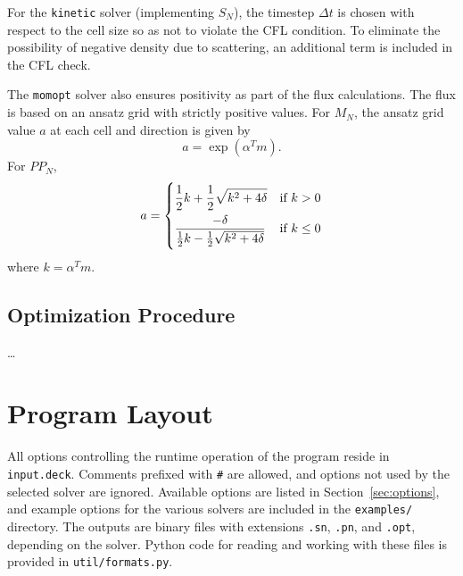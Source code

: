 \documentclass{article}
\newcommand{\kinetic}{\texttt{kinetic}\xspace}
\newcommand{\momopt}{\texttt{momopt}\xspace}
\begin{document}
For the \kinetic solver (implementing $S_N$), the timestep
$\Delta t$ is chosen with respect to the cell size so as not to violate
the CFL condition. To eliminate the possibility of negative density due
to scattering, an additional term is included in the CFL check. %

The \momopt solver also ensures positivity as part of the flux calculations.
The flux is based on an ansatz grid with strictly positive values. For $M_N$,
the ansatz grid value $a$ at each cell and direction is given by
\begin{equation}
    a = \exp (\alpha^T m).
\end{equation}
For $PP_N$,
\begin{equation}
a =
\begin{dcases}
    \frac{1}{2}k + \frac{1}{2}\sqrt{k^2 + 4\delta} & \text{if } k > 0 \\
    \frac{-\delta}{\frac{1}{2}k - \frac{1}{2}\sqrt{k^2 + 4\delta}} & \text{if } k \leq 0
\end{dcases}
\end{equation}
where $k = \alpha^T m$.

\subsection{Optimization Procedure}
\dots

\section{Program Layout}
All options controlling the runtime operation of the program reside in
\texttt{input.deck}. Comments prefixed with \texttt{\#} are allowed,
and options not used by the selected solver are ignored. Available options are
listed in Section~\ref{sec:options}, and example options for the various
solvers are included in the \texttt{examples/} directory.
The outputs are binary files with
extensions \texttt{.sn}, \texttt{.pn}, and \texttt{.opt}, depending on
the solver. Python code for reading and working with these files is provided
in \texttt{util/formats.py}.
\end{document}
